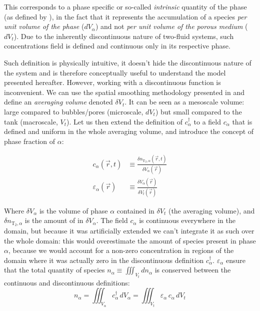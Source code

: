 \documentclass[a4paper,11pt,oneside]{report}
\newcommand{\PT}{\ensuremath{P_\mathrm{T_2}}}
\newcommand{\CT}{\ensuremath{c_\mathrm{T_2}}}
\begin{document}
This corresponds to a phase specific or so-called \textit{intrinsic} quantity of the phase (as defined by \cite{whitaker_method_1999}), in the fact that it represents the accumulation of a species \textit{per unit volume of the phase} ($d V_\alpha$) and not \textit{per unit volume of the porous medium} ($d V_t$). Due to the inherently discontinuous nature of two-fluid systems, such concentrations field is defined and continuous only in its respective phase.

Such definition is physically intuitive, it doesn't hide the discontinuous nature of the system and is therefore conceptually useful to understand the model presented hereafter. However, working with a discontinuous function is inconvenient. We can use the spatial smoothing methodology presented in \cite{gray_derivation_1975} and define an \textit{averaging volume} denoted $\delta V_t$. It can be seen as a mesoscale volume: large compared to bubbles/pores (microscale, $dV_t$) but small compared to the tank (macroscale, $V_t$). Let us then extend the definition of $c^\dag_\alpha$ to a field $c_\alpha$ that is defined and uniform in the whole averaging volume, and introduce the concept of phase fraction of $\alpha$:

\begin{align}
    c_\alpha (\vec r,t) &\equiv \frac{\delta n_{\mathrm{T_2},\alpha}(\vec r,t)}{\delta V_\alpha(\vec r)} \label{eq:def_c_generic}\\
    \varepsilon_\alpha(\vec r) &\equiv \frac{\delta V_\alpha(\vec r)}{\delta V_t(\vec r)} \label{eq:def_eps}
\end{align}

Where $\delta V_\alpha$ is the volume of phase $\alpha$ contained in $\delta V_t$ (the averaging volume), and $\delta n_{\mathrm{T_2},\alpha}$ is the amount of  in $\delta V_\alpha$. The field $c_\alpha$ is continuous everywhere in the domain, but because it was artificially extended we can't integrate it as such over the whole domain: this would overestimate the amount of species present in phase $\alpha$, because we would account for a non-zero concentration in regions of the domain where it was actually zero in the discontinuous definition $c^\dag_\alpha$. $\varepsilon_\alpha$ ensure that the total quantity of species $n_\alpha\equiv\iiint_{V_t}dn_\alpha$ is conserved between the continuous and discontinuous definitions: 
\begin{equation}
    \boxed{n_\alpha=\iiint_{V_\alpha}c^\dag_\alpha\,dV_\alpha=\iiint_{V_t}\varepsilon_\alpha \,c_\alpha\,dV_t \label{eq:def_n}}
\end{equation}
\end{document}
